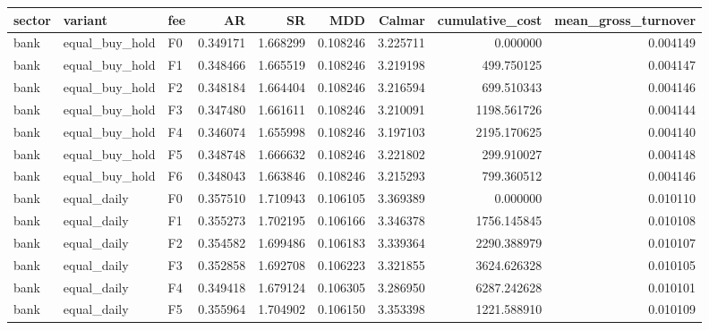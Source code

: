 \begin{tabular}{lllrrrrrr}
\toprule
    sector &                      variant & fee &        AR &        SR &      MDD &    Calmar &  cumulative\_cost &  mean\_gross\_turnover \\
\midrule
      bank &               equal\_buy\_hold &  F0 &  0.349171 &  1.668299 & 0.108246 &  3.225711 &         0.000000 &             0.004149 \\
      bank &               equal\_buy\_hold &  F1 &  0.348466 &  1.665519 & 0.108246 &  3.219198 &       499.750125 &             0.004147 \\
      bank &               equal\_buy\_hold &  F2 &  0.348184 &  1.664404 & 0.108246 &  3.216594 &       699.510343 &             0.004146 \\
      bank &               equal\_buy\_hold &  F3 &  0.347480 &  1.661611 & 0.108246 &  3.210091 &      1198.561726 &             0.004144 \\
      bank &               equal\_buy\_hold &  F4 &  0.346074 &  1.655998 & 0.108246 &  3.197103 &      2195.170625 &             0.004140 \\
      bank &               equal\_buy\_hold &  F5 &  0.348748 &  1.666632 & 0.108246 &  3.221802 &       299.910027 &             0.004148 \\
      bank &               equal\_buy\_hold &  F6 &  0.348043 &  1.663846 & 0.108246 &  3.215293 &       799.360512 &             0.004146 \\
      bank &                  equal\_daily &  F0 &  0.357510 &  1.710943 & 0.106105 &  3.369389 &         0.000000 &             0.010110 \\
      bank &                  equal\_daily &  F1 &  0.355273 &  1.702195 & 0.106166 &  3.346378 &      1756.145845 &             0.010108 \\
      bank &                  equal\_daily &  F2 &  0.354582 &  1.699486 & 0.106183 &  3.339364 &      2290.388979 &             0.010107 \\
      bank &                  equal\_daily &  F3 &  0.352858 &  1.692708 & 0.106223 &  3.321855 &      3624.626328 &             0.010105 \\
      bank &                  equal\_daily &  F4 &  0.349418 &  1.679124 & 0.106305 &  3.286950 &      6287.242628 &             0.010101 \\
      bank &                  equal\_daily &  F5 &  0.355964 &  1.704902 & 0.106150 &  3.353398 &      1221.588910 &             0.010109 \\

\end{tabular}
